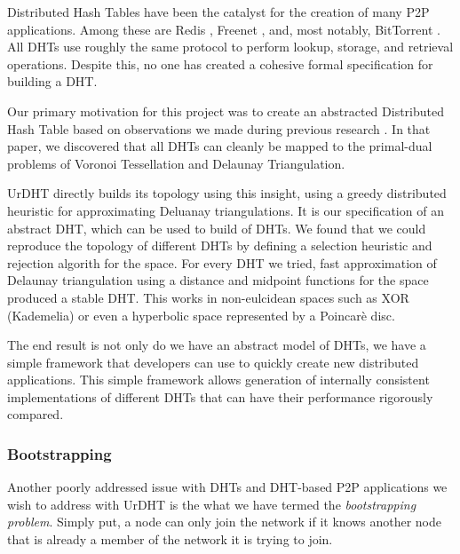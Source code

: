 \documentclass[11pt,conference]{IEEEtran}
\begin{document}
Distributed Hash Tables have been the catalyst for the creation of many P2P applications.
Among these are Redis \cite{redis}, Freenet \cite{freenet}, and, most notably, BitTorrent \cite{bittorrent}. 
All DHTs use roughly the same protocol to perform lookup, storage, and retrieval operations.
Despite this, no one has created a cohesive formal specification for building a DHT.

Our primary motivation for this project was to create an abstracted Distributed Hash Table based on observations we made during previous research \cite{dgvh}.
In that paper, we discovered that all DHTs can cleanly be mapped to the primal-dual problems of Voronoi Tessellation and Delaunay Triangulation.

UrDHT directly builds its topology using this insight, using a greedy distributed heuristic for approximating Deluanay triangulations.
It is our specification of an abstract DHT, which can be used to build of DHTs.
We found that we could reproduce the topology of different DHTs by defining a selection heuristic and rejection algorith for the space.
For every DHT we tried, fast approximation of Delaunay triangulation using a distance and midpoint functions for the space produced a stable DHT.  
This works in non-eulcidean spaces such as XOR (Kademelia) or even a hyperbolic space represented by a Poincar\`{e} disc.

The end result is not only do we have an abstract model of DHTs, we have a simple framework that developers can use to quickly create new distributed applications.
This simple framework allows generation of internally consistent implementations of different DHTs that can have their performance rigorously compared.  %



\subsubsection{Bootstrapping}
Another poorly addressed issue with DHTs and DHT-based P2P applications we wish to address with UrDHT is the what we have termed the \textit{bootstrapping problem}.
Simply put, a node can only join the network if it knows another node that is already a member of the network it is trying to join.
%



\end{document}
